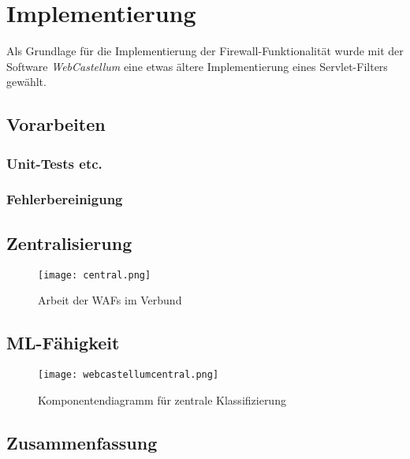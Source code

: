 \chapter{Implementierung}



Als Grundlage für die Implementierung der Firewall-Funktionalität wurde mit der Software \emph{WebCastellum} eine etwas ältere Implementierung eines Servlet-Filters gewählt.

\section{Vorarbeiten}

  
\subsection{Unit-Tests etc.}
\subsection{Fehlerbereinigung}

\section{Zentralisierung}
\begin{figure}[ht]
    \centering
    \texttt{[image: central.png]}
    \caption{Arbeit der WAFs im Verbund}
    \label{fig:my_verbund}
\end{figure}



\section{ML-Fähigkeit}

\begin{figure}[h]
    \centering
    \texttt{[image: webcastellumcentral.png]}
    \caption{Komponentendiagramm für zentrale Klassifizierung}
    \label{fig:my_future}
\end{figure}



\section{Zusammenfassung}



